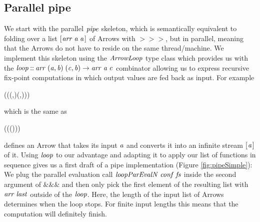 \documentclass[paper=A4,twoside=true,openright,parskip=full,chapterprefix=true,headings=normal,bibliography=totoc,listof=totoc,titlepage=on,captions=tableabove,draft=false,british]{scrreprt}%
\begin{document}
\hypertarget{parallel-pipe}{%
\subsection{Parallel pipe}\label{parallel-pipe}}

\label{sec:pipe}

We start with the parallel \ensuremath{\Varid{pipe}} skeleton, which is semantically
equivalent to folding over a list \ensuremath{[\mskip1.5mu \Varid{arr}\;\Varid{a}\;\Varid{a}\mskip1.5mu]} of Arrows with \ensuremath{\mathbin{>\!\!>\!\!>}}, but
in parallel, meaning that the Arrows do not have to reside on the same
thread/machine. We implement this skeleton using the \ensuremath{\Conid{ArrowLoop}} type
class which provides us with the \ensuremath{\Varid{loop}\mathbin{::}\Varid{arr}\;(\Varid{a},\Varid{b})\;(\Varid{c},\Varid{b})\to \Varid{arr}\;\Varid{a}\;\Varid{c}}
combinator allowing us to express recursive fix-point computations in
which output values are fed back as input. For example


\begin{hscode}\SaveRestoreHook
{}%
%
\>[B]{}\;(\;(\lambda (,)\to (,\mathbin{:}))){}\<[E]%
\ColumnHook
\end{hscode}\resethooks
\vspace{-2\baselineskip}

which is the same as


\begin{hscode}\SaveRestoreHook
{}%
%
\>[B]{}\;(\;\mathbin{\&\!\&\!\&}\;(\;(\mathbin{:}))){}\<[E]%
\ColumnHook
\end{hscode}\resethooks
\vspace{-2\baselineskip}

defines an Arrow that takes its input \ensuremath{\Varid{a}} and converts it into an
infinite stream \ensuremath{[\mskip1.5mu \Varid{a}\mskip1.5mu]} of it. Using \ensuremath{\Varid{loop}} to our advantage and adapting
it to apply our list of functions in sequence gives us a first draft of
a pipe implementation (Figure \ref{fig:pipeSimple}): We plug the
parallel evaluation call \ensuremath{\Varid{loopParEvalN}\;\Varid{conf}\;\Varid{fs}} inside the second
argument of \ensuremath{\mathbin{\&\!\&\!\&}} and then only pick the first element of the resulting
list with \ensuremath{\Varid{arr}\;\Varid{last}} outside of the \ensuremath{\Varid{loop}}. Here, the length of the
input list of Arrows determines when the loop stops. For finite input
lengths this means that the computation will definitely finish.
\end{document}
